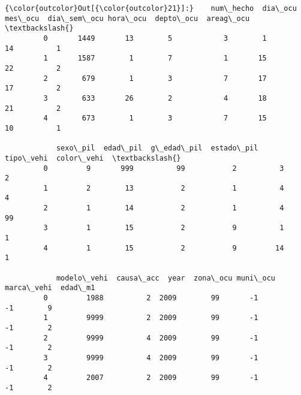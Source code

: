 \documentclass[11pt]{article}
\begin{document}
\begin{Verbatim}[commandchars=\\\{\}]
{\color{outcolor}Out[{\color{outcolor}21}]:}    num\_hecho  dia\_ocu  mes\_ocu  dia\_sem\_ocu hora\_ocu  depto\_ocu  areag\_ocu  \textbackslash{}
         0       1449       13        5            3        1         14          1   
         1       1587        1        7            1       15         22          2   
         2        679        1        3            7       17         17          2   
         3        633       26        2            4       18         21          2   
         4        673        1        3            7       15         10          1   
         
            sexo\_pil  edad\_pil  g\_edad\_pil  estado\_pil  tipo\_vehi  color\_vehi  \textbackslash{}
         0         9       999          99           2          3           2   
         1         2        13           2           1          4           4   
         2         1        14           2           1          4          99   
         3         1        15           2           9          1           1   
         4         1        15           2           9         14           1   
         
            modelo\_vehi  causa\_acc  year  zona\_ocu muni\_ocu  marca\_vehi  edad\_m1  
         0         1988          2  2009        99       -1          -1        9  
         1         9999          2  2009        99       -1          -1        2  
         2         9999          4  2009        99       -1          -1        2  
         3         9999          4  2009        99       -1          -1        2  
         4         2007          2  2009        99       -1          -1        2  
\end{Verbatim}
            
\end{document}
